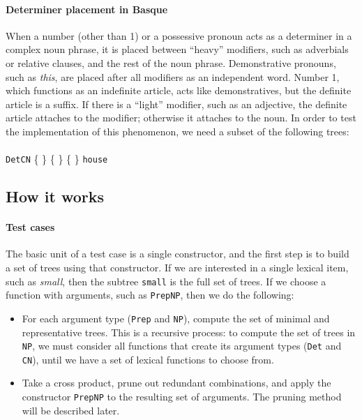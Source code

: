\documentclass[11pt]{article}
\def\t#1{\texttt{#1}}
\newcommand{\tts}[1]{{\tt #1}}
\begin{document}


\paragraph{Determiner placement in Basque} When a number (other than 1) or a
possessive pronoun acts as a determiner in a complex noun phrase, it
is placed between ``heavy'' modifiers, such as adverbials or relative clauses,
and the rest of the noun phrase. Demonstrative pronouns, such as \emph{this}, 
 are placed after all modifiers as an independent word. Number 1,
 which functions as an indefinite article, acts like demonstratives, but
 the definite article is a suffix. If there is a ``light'' modifier,
 such as an adjective, the definite article attaches to the modifier;
 otherwise it attaches to the noun. In order to test the
 implementation of this phenomenon, we need a
subset of the following trees: \\ \\ 
\t{DetCN} \{
\stackanchor{\stackanchor{\tts{a}}{\tts{the}}}{\stackanchor{\tts{this}}{\tts{your}}}
\} \{  \} 
\{  \}  {\tt house} 


\subsection{How it works}

\paragraph{Test cases} 
The basic unit of a test case is a single constructor, and the first step 
is to build a set of trees using that constructor.
If we are interested in a single lexical item, such as \emph{small}, 
then the subtree \t{small} is the full set of trees. If we choose a function 
with arguments, such as \t{PrepNP}, then we do the following: 
\begin{itemize}
\item For each argument type (\t{Prep} and \t{NP}), compute the
  set of minimal and representative trees. This is a recursive
  process: to compute the set of trees in \t{NP}, we must consider
  all functions that create its argument types (\t{Det} and \t{CN}),
  until we have a set of lexical functions to choose from. 
\item Take a cross product, prune out redundant combinations, and
  apply the constructor \t{PrepNP} to the resulting set of
  arguments. The pruning method will be described later. 
\end{itemize}
\end{document}
